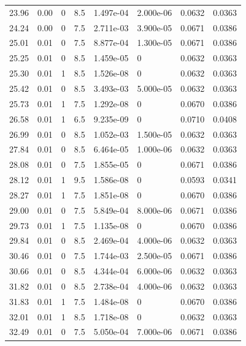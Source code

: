 \documentclass[preview]{standalone}
\begin{document}
{{{\begin{tabular}{L{1.2cm}C{1.2cm} C{0.3cm}C{0.5cm} C{1.4cm}C{1.4cm} C{1.4cm}C{1.4cm}}
  23.96  &  0.00  & 0     & 8.5 &  1.497e-04  & 2.000e-06  & 0.0632 &  0.0363   \\ 
  24.24  &  0.00  & 0     & 7.5 &  2.711e-03  & 3.900e-05  & 0.0671 &  0.0386   \\ 
  25.01  &  0.01  & 0     & 7.5 &  8.877e-04  & 1.300e-05  & 0.0671 &  0.0386   \\ 
  25.25  &  0.01  & 0     & 8.5 &  1.459e-05  & 0  & 0.0632 &  0.0363   \\ 
  25.30  &  0.01  & 1     & 8.5 &  1.526e-08  & 0  & 0.0632 &  0.0363   \\ 
  25.42  &  0.01  & 0     & 8.5 &  3.493e-03  & 5.000e-05  & 0.0632 &  0.0363   \\ 
  25.73  &  0.01  & 1     & 7.5 &  1.292e-08  & 0  & 0.0670 &  0.0386   \\ 
  26.58  &  0.01  & 1     & 6.5 &  9.235e-09  & 0  & 0.0710 &  0.0408   \\ 
  26.99  &  0.01  & 0     & 8.5 &  1.052e-03  & 1.500e-05  & 0.0632 &  0.0363   \\ 
  27.84  &  0.01  & 0     & 8.5 &  6.464e-05  & 1.000e-06  & 0.0632 &  0.0363   \\ 
  28.08  &  0.01  & 0     & 7.5 &  1.855e-05  & 0  & 0.0671 &  0.0386   \\ 
  28.12  &  0.01  & 1     & 9.5 &  1.586e-08  & 0  & 0.0593 &  0.0341   \\ 
  28.27  &  0.01  & 1     & 7.5 &  1.851e-08  & 0  & 0.0670 &  0.0386   \\ 
  29.00  &  0.01  & 0     & 7.5 &  5.849e-04  & 8.000e-06  & 0.0671 &  0.0386   \\ 
  29.73  &  0.01  & 1     & 7.5 &  1.135e-08  & 0  & 0.0670 &  0.0386   \\ 
  29.84  &  0.01  & 0     & 8.5 &  2.469e-04  & 4.000e-06  & 0.0632 &  0.0363   \\ 
  30.46  &  0.01  & 0     & 7.5 &  1.744e-03  & 2.500e-05  & 0.0671 &  0.0386   \\ 
  30.66  &  0.01  & 0     & 8.5 &  4.344e-04  & 6.000e-06  & 0.0632 &  0.0363   \\ 
  31.82  &  0.01  & 0     & 8.5 &  2.738e-04  & 4.000e-06  & 0.0632 &  0.0363   \\ 
  31.83  &  0.01  & 1     & 7.5 &  1.484e-08  & 0  & 0.0670 &  0.0386   \\ 
  32.01  &  0.01  & 1     & 8.5 &  1.718e-08  & 0  & 0.0632 &  0.0363   \\ 
  32.49  &  0.01  & 0     & 7.5 &  5.050e-04  & 7.000e-06  & 0.0671 &  0.0386   \\ 

\end{tabular}}}}
\end{document}
